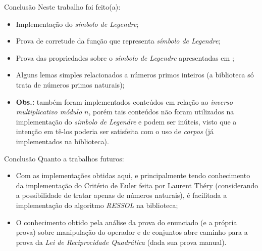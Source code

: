 \begin{frame}{Conclusão}
    Neste trabalho foi feito(a):
    \begin{itemize}
        \item Implementação do \textit{símbolo de Legendre};
        \item Prova de corretude da função que representa \textit{símbolo de Legendre};
        \item Prova das propriedades sobre o \textit{símbolo de Legendre} apresentadas em \cite{book:2399854};
        \item Alguns lemas simples relacionados a números primos inteiros (a biblioteca só trata de números primos naturais);
        
        \item[] \textbf{Obs.:} também foram implementados conteúdos em relação ao \textit{inverso multiplicativo módulo $n$}, porém tais conteúdos não foram utilizados na implementação do \textit{símbolo de Legendre} e podem ser inúteis, visto que a intenção em tê-los poderia ser satisfeita com o uso de \textit{corpos} (já implementados na biblioteca).
    \end{itemize}
\end{frame}

\begin{frame}{Conclusão}
    Quanto a trabalhos futuros:
    \begin{itemize}
        \item Com as implementações obtidas aqui, e principalmente tendo conhecimento da implementação do Critério de Euler feita por Laurent Théry (considerando a possibilidade de tratar apenas de números naturais), é facilitada a implementação do algoritmo \textit{RESSOL} na biblioteca;
        \item O conhecimento obtido pela análise da prova do enunciado  (e a própria prova) sobre manipulação do operador  e de conjuntos abre caminho para a prova da \textit{Lei de Reciprocidade Quadrática} (dada sua prova manual).
    \end{itemize}
\end{frame}
